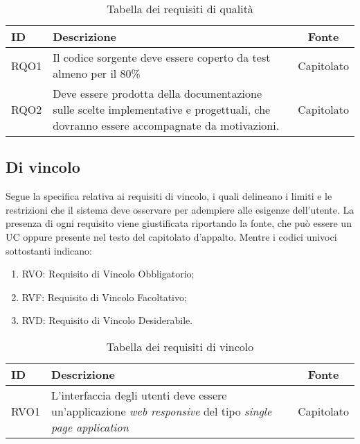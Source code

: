 \begin{table}[H]
	\renewcommand{\arraystretch}{1.5}
	\centering
	\begin{tabularx}{\textwidth}{l|X|c}
		\textbf{ID} & \textbf{Descrizione}                                                                                                                  & \textbf{Fonte} \\
		\hline
		RQO1        & Il codice sorgente deve essere coperto da test almeno per il 80\%                                                                     & Capitolato     \\
		\hline
		RQO2        & Deve essere prodotta della documentazione sulle scelte implementative e progettuali, che dovranno essere accompagnate da motivazioni. & Capitolato     \\
		\hline
	\end{tabularx}
	\caption{Tabella dei requisiti di qualità}
\end{table}

\subsection{Di vincolo}

Segue la specifica relativa ai requisiti di vincolo, i quali delineano i limiti e le restrizioni che il sistema deve osservare per adempiere alle esigenze dell'utente.
La presenza di ogni requisito viene giustificata riportando la fonte, che può essere un UC oppure presente 
nel testo del capitolato d'appalto. Mentre i codici univoci sottostanti indicano:
\begin{enumerate}
	\item RVO: Requisito di Vincolo Obbligatorio;
	\item RVF: Requisito di Vincolo Facoltativo;
	\item RVD: Requisito di Vincolo Desiderabile.
\end{enumerate}

\begin{table}[H]
	\renewcommand{\arraystretch}{1.5}
	\centering
	\begin{tabularx}{\textwidth}{l|X|c}
		\textbf{ID} & \textbf{Descrizione}                                                                                   & \textbf{Fonte} \\
		\hline
		RVO1        & L'interfaccia degli utenti deve essere un'applicazione \textit{web responsive} del tipo \textit{single page application} & Capitolato     \\
		\hline
	\end{tabularx}
	\caption{Tabella dei requisiti di vincolo}
\end{table}
